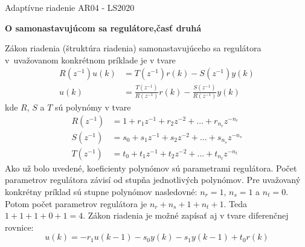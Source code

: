 \documentclass[a4paper, 10pt, ]{article}
\def\oznacenieCasti{AR04 - LS2020}
\begin{document}
\fontsize{12pt}{22pt}\selectfont

\centerline{\textsf{Adaptívne riadenie} \hfill \textsf{\oznacenieCasti}}

\fontsize{18pt}{22pt}\selectfont





\begin{flushleft}
	\textbf{\textsf{O samonastavujúcom sa regulátore,\newline časť druhá}}
\end{flushleft}





\normalsize

\bigskip

\tableofcontents

\bigskip

\vspace{18pt}




\noindent
Zákon riadenia (štruktúra riadenia) samonastavujúceho sa regulátora v~uvažovanom konkrétnom príklade je v tvare
\begin{subequations} \label{zakonRiadenia}
	\begin{align}
		R(z^{-1})u(k) & = T(z^{-1})r(k) - S(z^{-1})y(k) \\
		u(k) & = \frac{T(z^{-1})}{R(z^{-1})}r(k) - \frac{S(z^{-1})}{R(z^{-1})}y(k)
	\end{align}
\end{subequations}
kde $R$, $S$ a $T$ sú polynómy v tvare
\begin{subequations}
	\begin{align}
		R(z^{-1}) & = 1 + r_1z^{-1} + r_2z^{-2} + \ldots +  r_{n_r}z^{-n_r}\\
		S(z^{-1}) & = s_0 + s_1z^{-1} + s_2z^{-2} + \ldots +  s_{n_s}z^{-n_s} \\
		T(z^{-1}) & = t_0 + t_1z^{-1} + t_2z^{-2} + \ldots +  t_{n_t}z^{-n_t}
	\end{align}
\end{subequations}
Ako už bolo uvedené, koeficienty polynómov sú parametrami regulátora. Počet parametrov regulátora závisí od stupňa jednotlivých polynómov. Pre uvažovaný konkrétny príklad sú stupne polynómov nasledovné: $n_r = 1$, $n_s = 1$ a $n_t = 0$. Potom počet parametrov regulátora je $n_r + n_s + 1 + n_t + 1$. Teda $1 + 1 + 1 + 0 + 1 = 4$. Zákon riadenia je možné zapísať aj v tvare diferenčnej rovnice:
\begin{equation}
	u(k) =  - r_1 u(k-1) - s_0 y(k) - s_1 y(k-1) + t_0 r(k)
\end{equation}
\end{document}
